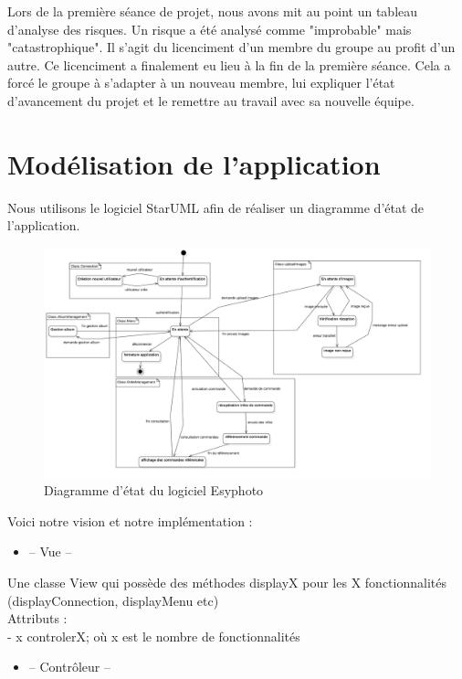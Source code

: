 \documentclass{article}
\begin{document}
\begin{flushleft}
Lors de la première séance de projet, nous avons mit au point un tableau
d'analyse des risques. Un risque a été analysé comme "improbable" mais
"catastrophique". Il s'agit du licenciment d'un membre du groupe au profit
d'un autre. Ce licenciment a finalement eu lieu à la fin de la première
séance. Cela a forcé le groupe à s'adapter à un nouveau membre, lui
expliquer l'état d'avancement du projet et le remettre au travail avec sa
nouvelle équipe.

\newpage
\section{Modélisation de l'application}

Nous utilisons le logiciel StarUML afin de réaliser un diagramme d'état
de l'application.

\begin{figure}[!h]
  \begin{center}
    \includegraphics[scale=0.3]{fig2} %
    \caption{Diagramme d'état du logiciel Esyphoto}
  \end{center}
\end{figure}

Voici notre vision et notre implémentation : \\
\vspace{1\baselineskip}
\begin{itemize}
  \item -- Vue --
\end{itemize}



Une classe View qui possède des méthodes displayX pour les X fonctionnalités
(displayConnection, displayMenu etc)\\
Attributs :\\
- x controlerX; où x est le nombre de fonctionnalités
\vspace{1\baselineskip}
\begin{itemize}
  \item -- Contrôleur --
\end{itemize}



\end{flushleft}
\end{document}
